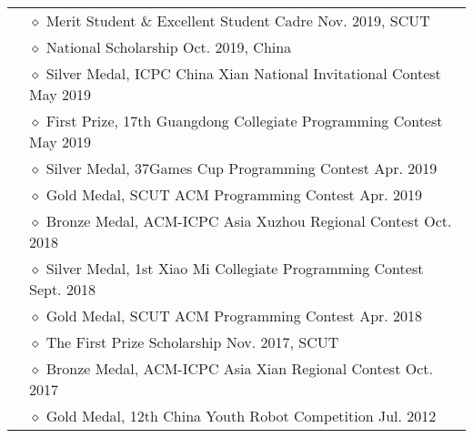 \documentclass[letterpaper, 10pt]{article}
\begin{document}
\begin{longtable}{p{0.7in}p{6.0in}}
& $\diamond$ Merit Student \& Excellent Student Cadre \hfill Nov. 2019, SCUT \\
& $\diamond$ National Scholarship \hfill Oct. 2019, China \\

& $\diamond$ Silver Medal, ICPC China Xian National Invitational Contest \hfill May 2019 \\

& $\diamond$ First Prize, 17th Guangdong Collegiate Programming Contest \hfill May 2019 \\

& $\diamond$ Silver Medal, 37Games Cup Programming Contest \hfill Apr. 2019 \\

& $\diamond$ Gold Medal, SCUT ACM Programming Contest \hfill Apr. 2019 \\

& $\diamond$ Bronze Medal, ACM-ICPC Asia Xuzhou Regional Contest \hfill Oct. 2018 \\

& $\diamond$ Silver Medal, 1st Xiao Mi Collegiate Programming Contest \hfill Sept. 2018 \\

& $\diamond$ Gold Medal, SCUT ACM Programming Contest \hfill Apr. 2018 \\

& $\diamond$ The First Prize Scholarship \hfill Nov. 2017, SCUT \\

& $\diamond$ Bronze Medal, ACM-ICPC Asia Xian Regional Contest \hfill Oct. 2017 \\

& $\diamond$ Gold Medal, 12th China Youth Robot Competition \hfill Jul. 2012 \\


\end{longtable}
\end{document}
